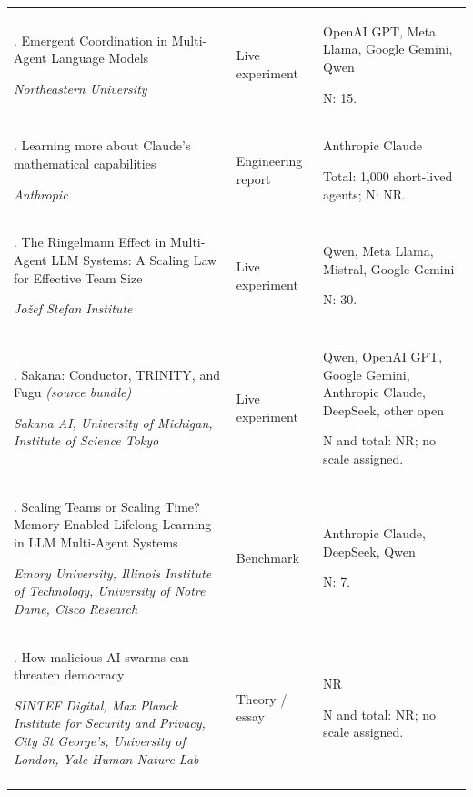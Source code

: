 \begin{longtable}{@{}>{\raggedright\arraybackslash}p{}>{\raggedright\arraybackslash}p{}>{\raggedright\arraybackslash}p{}@{}}
124. Emergent Coordination in Multi-Agent Language Models \citep{riedl-emergent-coordination}\par\emph{Northeastern University} & Live experiment & OpenAI GPT, Meta Llama, Google Gemini, Qwen\par N: 15. \\ \addlinespace[2pt]
125. Learning more about Claude's mathematical capabilities \citep{riemann-zeta-swarm}\par\emph{Anthropic} & Engineering report & Anthropic Claude\par Total: 1,000 short-lived agents; N: NR. \\ \addlinespace[2pt]
126. The Ringelmann Effect in Multi-Agent LLM Systems: A Scaling Law for Effective Team Size \citep{ringelmann-effect}\par\emph{Jožef Stefan Institute} & Live experiment & Qwen, Meta Llama, Mistral, Google Gemini\par N: 30. \\ \addlinespace[2pt]
127. Sakana: Conductor, TRINITY, and Fugu \emph{(source bundle)} \citep{sakana-fugu-report,sakana-conductor,sakana-trinity}\par\emph{Sakana AI, University of Michigan, Institute of Science Tokyo} & Live experiment & Qwen, OpenAI GPT, Google Gemini, Anthropic Claude, DeepSeek, other open\par N and total: NR; no scale assigned. \\ \addlinespace[2pt]
128. Scaling Teams or Scaling Time? Memory Enabled Lifelong Learning in LLM Multi-Agent Systems \citep{scaling-teams-or-time}\par\emph{Emory University, Illinois Institute of Technology, University of Notre Dame, Cisco Research} & Benchmark & Anthropic Claude, DeepSeek, Qwen\par N: 7. \\ \addlinespace[2pt]
129. How malicious AI swarms can threaten democracy \citep{science-malicious-swarms}\par\emph{SINTEF Digital, Max Planck Institute for Security and Privacy, City St George’s, University of London, Yale Human Nature Lab} & Theory / essay & NR\par N and total: NR; no scale assigned. \\ \addlinespace[2pt]

\end{longtable}
